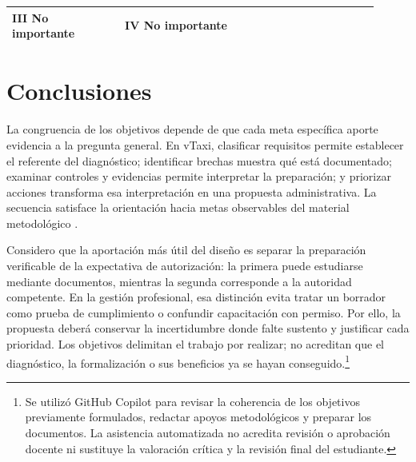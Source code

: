 {\begin{longtable}{p{0.28\linewidth}p{0.63\linewidth}}
III No importante & IV No importante \\ \hline

\end{longtable}

\clearpage\section{Conclusiones}

La congruencia de los objetivos depende de que cada meta específica aporte evidencia a la pregunta general. En vTaxi, clasificar requisitos permite establecer el referente del diagnóstico; identificar brechas muestra qué está documentado; examinar controles y evidencias permite interpretar la preparación; y priorizar acciones transforma esa interpretación en una propuesta administrativa. La secuencia satisface la orientación hacia metas observables del material metodológico .

\par Considero que la aportación más útil del diseño es separar la preparación verificable de la expectativa de autorización: la primera puede estudiarse mediante documentos, mientras la segunda corresponde a la autoridad competente. En la gestión profesional, esa distinción evita tratar un borrador como prueba de cumplimiento o confundir capacitación con permiso. Por ello, la propuesta deberá conservar la incertidumbre donde falte sustento y justificar cada prioridad. Los objetivos delimitan el trabajo por realizar; no acreditan que el diagnóstico, la formalización o sus beneficios ya se hayan conseguido.\footnote{Se utilizó GitHub Copilot para revisar la coherencia de los objetivos previamente formulados, redactar apoyos metodológicos y preparar los documentos. La asistencia automatizada no acredita revisión o aprobación docente ni sustituye la valoración crítica y la revisión final del estudiante.}
}
\def\seminarioreferencias{\clearpage
\renewcommand{\refname}{Referencias}
\begin{thebibliography}{3}
\setlength{\itemsep}{1em}
\bibitem[H. Congreso del Estado de Nuevo León(2026)]{leyNL}
H. Congreso del Estado de Nuevo León. (2026). \textit{Ley de Movilidad Sostenible, de Accesibilidad y Seguridad Vial para el Estado de Nuevo León} (última reforma publicada el 22 de mayo de 2026; arts. 82, 83, 99 y 100). \url{https://www.hcnl.gob.mx/trabajo_legislativo/leyes/leyes/ley_de_movilidad_sostenible_y_accesibilidad_para_el_estado_de_nuevo_leon/}
\bibitem[Instituto de Capacitación y Educación para el Trabajo del Estado de Nuevo León(s. f.)]{icetNL}
Instituto de Capacitación y Educación para el Trabajo del Estado de Nuevo León. (s. f.). \textit{ICET}. Recuperado el 27 de septiembre de 2026, de \url{https://icetnl.mx/}
\bibitem[Instituto Tecnológico Superior de Cajeme(s. f.)]{itesca33}
Instituto Tecnológico Superior de Cajeme. (s. f.). \textit{Formulación de objetivos general y específicos} [Material didáctico de Seminario I, Unidad 3, apartado 3.3]. \url{https://cursos3.e-itesca.edu.mx/mod/resource/view.php?id=2897}
\end{thebibliography}}

